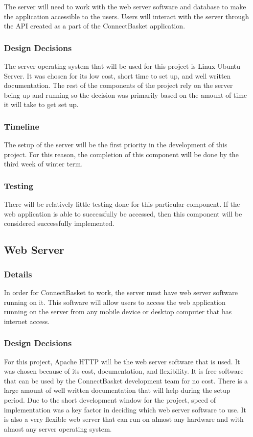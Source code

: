 \documentclass[onecolumn, draftclsnofoot,10pt, compsoc]{IEEEtran}
\begin{document}
The server will need to work with the web server software and database to make the application accessible to the users.  Users will interact with the server through the API created as a part of the ConnectBasket application.


\subsubsection{Design Decisions}
The server operating system that will be used for this project is Linux Ubuntu Server. It was chosen for its low cost, short time to set up, and well written documentation. The rest of the components of the project rely on the server being up and running so the decision was primarily based on the amount of time it will take to get set up.


\subsubsection{Timeline}
The setup of the server will be the first priority in the development of this project. For this reason, the completion of this component will be done by the third week of winter term.

\subsubsection{Testing}
There will be relatively little testing done for this particular component. If the web application is able to successfully be accessed, then this component will be considered successfully implemented.


\subsection{Web Server}

\subsubsection{Details}
In order for ConnectBasket to work, the server must have web server software running on it. This software will allow users to access the web application running on the server from any mobile device or desktop computer that has internet access.

\subsubsection{Design Decisions}
For this project, Apache HTTP will be the web server software that is used. It was chosen because of its cost, documentation, and flexibility. It is free software that can be used by the ConnectBasket development team for no cost. There is a large amount of well written documentation that will help during the setup period. Due to the short development window for the project, speed of implementation was a key factor in deciding which web server software to use. It is also a very flexible web server that can run on almost any hardware and with almost any server operating system.
\end{document}
